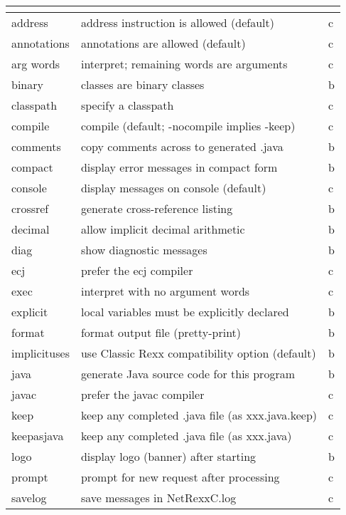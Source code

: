 \begin{longtable}[l]{|l|p{10cm}|l|}
\endlastfoot
\rowcolor[gray]{0.8} \bfseries \huge   & \normalsize  &  \\
\hline
address & address instruction is allowed (default) & c \\
\hline
annotations & annotations are allowed (default) & c \\
\hline
arg words & interpret; remaining words are arguments & c \\
\hline
binary &  classes are binary classes & b \\
\hline
 classpath  & specify a classpath & c \\
\hline
 compile  & compile (default; -nocompile implies -keep) & c \\
\hline
 comments     & copy comments across to generated .java &b \\
\hline
 compact      & display error messages in compact form &b \\
\hline
 console   & display messages on console (default) &c \\
\hline
 crossref     & generate cross-reference listing &b \\
\hline
 decimal      & allow implicit decimal arithmetic &b \\
\hline
 diag         & show diagnostic messages &b \\
\hline
 ecj        & prefer the ecj compiler &c \\
\hline
 exec        & interpret with no argument words &c \\
\hline
explicit     & local variables must be explicitly declared &b \\
\hline
format       & format output file (pretty-print) &b \\
\hline
implicituses & use Classic Rexx compatibility option (default) &b \\ 
\hline
 java         & generate Java source code for this program &b \\
\hline
 javac         & prefer the javac compiler &c \\
\hline
 keep         & keep any completed .java file (as xxx.java.keep) &c \\
\hline
keepasjava   & keep any completed .java file (as xxx.java) &c \\
\hline
 logo         & display logo (banner) after starting &b \\
\hline
prompt       & prompt for new request after processing &c \\
\hline
 savelog      & save messages in NetRexxC.log &c \\

\end{longtable}

